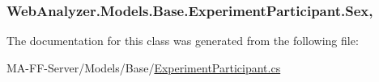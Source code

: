 \subsubsection[{Sex}]{ Web\+Analyzer.\+Models.\+Base.\+Experiment\+Participant.\+Sex\hspace{0.3cm}{\ttfamily [get]}, {\ttfamily [set]}}\label{class_web_analyzer_1_1_models_1_1_base_1_1_experiment_participant_af836bfc33d73671eec06864ce395b9a2}


The documentation for this class was generated from the following file\+:\begin{DoxyCompactItemize}
\item 
M\+A-\/\+F\+F-\/\+Server/\+Models/\+Base/\hyperlink{_experiment_participant_8cs}{Experiment\+Participant.\+cs}\end{DoxyCompactItemize}
